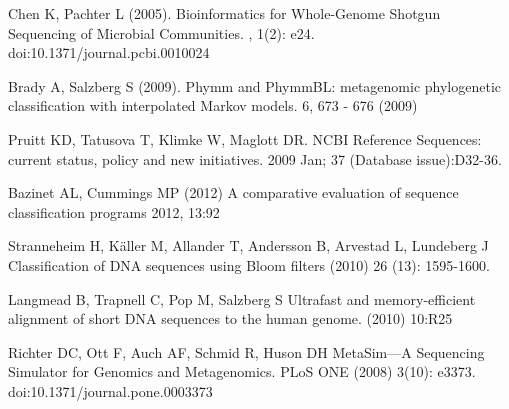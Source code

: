 \documentclass[12pt]{article} %
\begin{document}
\begin{thebibliography}{99} %
Chen K, Pachter L (2005). 
\newblock Bioinformatics for Whole-Genome Shotgun Sequencing of Microbial Communities. 
, 1(2): e24. doi:10.1371/journal.pcbi.0010024

Brady A, Salzberg S (2009).
\newblock Phymm and PhymmBL: metagenomic phylogenetic classification with interpolated Markov models.
 6, 673 - 676 (2009) 

Pruitt KD, Tatusova T, Klimke W, Maglott DR. 
\newblock NCBI Reference Sequences: current status, policy and new initiatives. 
 2009 Jan; 37 (Database issue):D32-36.

Bazinet AL, Cummings MP (2012)
\newblock A comparative evaluation of sequence classification programs
 2012, 13:92

Stranneheim H, Käller M,  Allander T,  Andersson B,  Arvestad L,  Lundeberg J 
\newblock Classification of DNA sequences using Bloom filters
 (2010) 26 (13): 1595-1600.

Langmead B,  Trapnell C,  Pop M,  Salzberg S
\newblock Ultrafast and memory-efficient alignment of short DNA sequences to the human genome.
 (2010) 10:R25

Richter DC, Ott F, Auch AF, Schmid R, Huson DH 
\newblock MetaSim—A Sequencing Simulator for Genomics and Metagenomics. 
\newblock PLoS ONE (2008) 3(10): e3373. doi:10.1371/journal.pone.0003373
\end{thebibliography}
\end{document}
